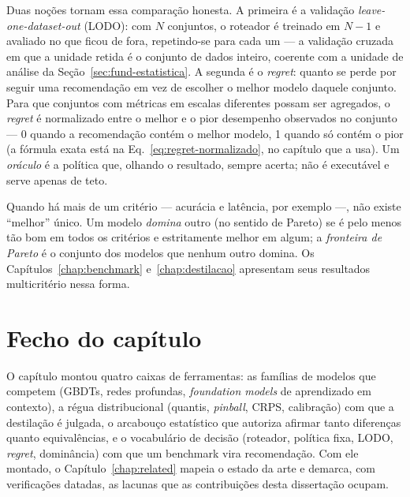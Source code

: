 Duas noções tornam essa comparação honesta. A primeira é a validação
\emph{leave-one-dataset-out} (LODO): com $N$ conjuntos, o roteador é
treinado em $N-1$ e avaliado no que ficou de fora, repetindo-se para
cada um --- a validação cruzada em que a unidade retida é o conjunto
de dados inteiro, coerente com a unidade de análise da
Seção~\ref{sec:fund-estatistica}. A segunda é o \emph{regret}:
quanto se perde por seguir uma recomendação em vez de escolher o
melhor modelo daquele conjunto. Para que conjuntos com métricas em
escalas diferentes possam ser agregados, o \emph{regret} é
normalizado entre o melhor e o pior desempenho observados no conjunto
--- 0 quando a recomendação contém o melhor modelo, 1 quando só contém
o pior (a fórmula exata está na Eq.~\ref{eq:regret-normalizado}, no
capítulo que a usa). Um \emph{oráculo} é a política que, olhando o
resultado, sempre acerta; não é executável e serve apenas de teto.

Quando há mais de um critério --- acurácia e latência, por exemplo ---,
não existe ``melhor'' único. Um modelo \emph{domina} outro (no
sentido de Pareto) se é pelo menos tão bom em todos os critérios e
estritamente melhor em algum; a \emph{fronteira de Pareto} é o
conjunto dos modelos que nenhum outro domina. Os
Capítulos~\ref{chap:benchmark} e~\ref{chap:destilacao} apresentam
seus resultados multicritério nessa forma.

\section{Fecho do capítulo}

O capítulo montou quatro caixas de ferramentas: as famílias de modelos
que competem (GBDTs, redes profundas, \emph{foundation models} de
aprendizado em contexto), a régua distribucional (quantis,
\emph{pinball}, CRPS, calibração) com que a destilação é julgada, o
arcabouço estatístico que autoriza afirmar tanto diferenças quanto
equivalências, e o vocabulário de decisão (roteador, política fixa,
LODO, \emph{regret}, dominância) com que um benchmark vira
recomendação. Com ele montado, o
Capítulo~\ref{chap:related} mapeia o
estado da arte e demarca, com verificações datadas, as lacunas que as
contribuições desta dissertação ocupam.

